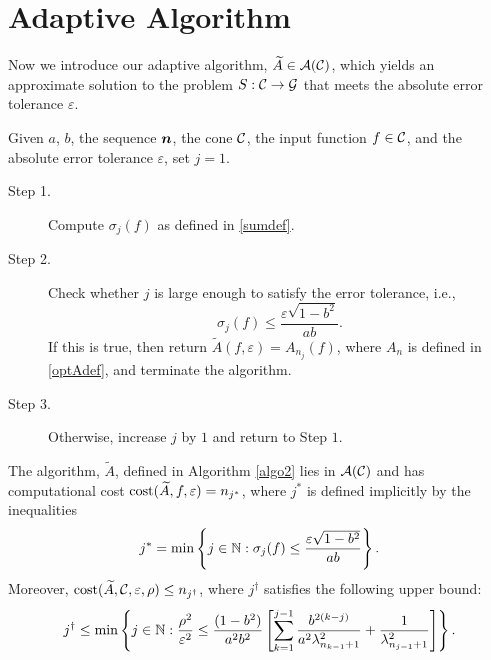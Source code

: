 \documentclass[graybox,footinfo]{svmult}
\begin{document}
\section{Adaptive Algorithm} \label{sec:adaptalgo}

Now we introduce our adaptive algorithm, $\widetilde{A} \in {\mathcal{A}}({\mathcal{C}})$, which yields an approximate solution to the problem $S:{\mathcal{C}}\rightarrow{\mathcal{G}}$ that meets the absolute error tolerance $\varepsilon$.

\begin{algo}\label{algo2}
Given $a$, $b$, the sequence ${\boldsymbol{n}}$, the cone ${\mathcal{C}}$, the input function $f \in {\mathcal{C}}$, and the absolute error tolerance $\varepsilon$, set $j=1$.
\begin{description}
\item[Step 1.] Compute $\sigma_{j}(f)$ as defined in \eqref{sumdef}.
\item[Step 2.] Check whether $j$ is large enough to satisfy the error tolerance, i.e.,
    \begin{equation*}\label{covcrit}
          \sigma_{j}(f) \le \frac{\varepsilon\sqrt{1 - b^2}}{ab} .
    \end{equation*}
    If this is true, then return $\widetilde{A}(f,\varepsilon) = A_{n_{j}}(f)$, where $A_n$ is defined in \eqref{optAdef}, and terminate the algorithm.
\item[Step 3.] Otherwise, increase $j$ by $1$ and return to Step $1$.
\end{description}
\end{algo}

\begin{theorem}\label{thm:compcost}
The algorithm, $\widetilde{A}$, defined in Algorithm \ref{algo2} lies in ${\mathcal{A}}({\mathcal{C}})$ and has computational cost $\textup{cost}(\widetilde{A},f,\varepsilon)=n_{j^*}$, where $j^*$ is defined implicitly by the inequalities 
\begin{equation} \label{eq:OurAlgjstar}
j^* = \min\left \{ j \in \bbN : \sigma_{j}(f) \le \frac{\varepsilon\sqrt{1 - b^2}}{ab}  \right\}.
\end{equation}
Moreover, $\textup{cost}(\widetilde{A},{\mathcal{C}},\varepsilon,\rho) \le n_{j^\dagger}$, where $j^\dagger$ satisfies the following upper bound:
\begin{equation} \label{jdagger}
j^\dagger \le \min \left \{j \in \bbN : \frac{\rho^2}{\varepsilon^2} \le \frac{(1 - b^2)}{a^2b^2} \left[ \sum_{k=1}^{j-1} \frac{b^{2(k-j)}}{a^2\lambda_{n_{k-1}+1}^2} + \frac{1}{\lambda_{n_{j-1}+1}^2}\right]   \right\}.
\end{equation}

\end{theorem}
\end{document}
